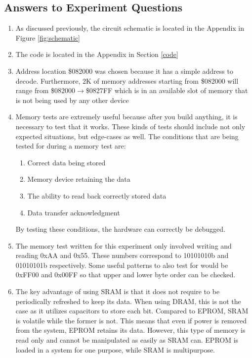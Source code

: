 \documentclass[12pt, twocolumn]{article}
\begin{document}
\subsection{Answers to Experiment Questions}
\begin{enumerate}
	\item As discussed previously, the circuit schematic is located in the Appendix in Figure \ref{fig:schematic}
	\item The code is located in the Appendix in Section \ref{code}
	\item Address location \$082000 was chosen because it has a simple address to decode. Furthermore, 2K of memory addresses starting from \$082000 will range from \$082000$\to$\$0827FF which is in an available slot of memory that is not being used by any other device
	\item Memory tests are extremely useful because after you build anything, it is necessary to test that it works. These kinds of tests should include not only expected situations, but edge-cases as well. The conditions that are being tested for during a memory test are:
	\begin{enumerate}
		\item Correct data being stored
		\item Memory device retaining the data
		\item The ability to read back correctly stored data
		\item Data transfer acknowledgment
	\end{enumerate}
	By testing these conditions, the hardware can correctly be debugged.
	\item The memory test written for this experiment only involved writing and reading 0xAA and 0x55. These numbers correspond to 10101010b and 01010101b respectively. Some useful patterns to also test for would be 0xFF00 and 0x00FF so that upper and lower byte order can be checked.
	\item The key advantage of using SRAM is that it does not require to be periodically refreshed to keep its data. When using DRAM, this is not the case as it utilizes capacitors to store each bit. Compared to EPROM, SRAM is volatile while the former is not. This means that even if power is removed from the system, EPROM retains its data. However, this type of memory is read only and cannot be manipulated as easily as SRAM can. EPROM is loaded in a system for one purpose, while SRAM is multipurpose.
\end{enumerate}
\end{document}
